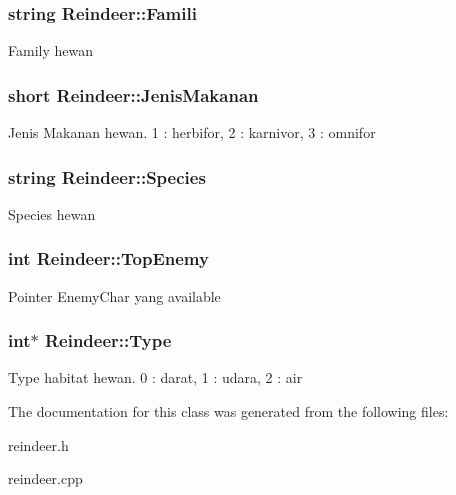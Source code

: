 \subsubsection[{\texorpdfstring{Famili}{Famili}}]{\setlength{\rightskip}{0pt plus 5cm}string Reindeer\+::\+Famili\hspace{0.3cm}{\ttfamily [protected]}}\hypertarget{class_reindeer_a76954572639868570bb712fa5e9f2416}{}\label{class_reindeer_a76954572639868570bb712fa5e9f2416}
Family hewan 
\subsubsection[{\texorpdfstring{Jenis\+Makanan}{JenisMakanan}}]{\setlength{\rightskip}{0pt plus 5cm}short Reindeer\+::\+Jenis\+Makanan\hspace{0.3cm}{\ttfamily [protected]}}\hypertarget{class_reindeer_a22bd8b287b1371169d059c37c4508572}{}\label{class_reindeer_a22bd8b287b1371169d059c37c4508572}
Jenis Makanan hewan. 1 \+: herbifor, 2 \+: karnivor, 3 \+: omnifor 
\subsubsection[{\texorpdfstring{Species}{Species}}]{\setlength{\rightskip}{0pt plus 5cm}string Reindeer\+::\+Species\hspace{0.3cm}{\ttfamily [protected]}}\hypertarget{class_reindeer_a01c318a23a5f18c9a9a854e8f4c5530a}{}\label{class_reindeer_a01c318a23a5f18c9a9a854e8f4c5530a}
Species hewan 
\subsubsection[{\texorpdfstring{Top\+Enemy}{TopEnemy}}]{\setlength{\rightskip}{0pt plus 5cm}int Reindeer\+::\+Top\+Enemy\hspace{0.3cm}{\ttfamily [protected]}}\hypertarget{class_reindeer_a5a17ac5ba35fd3f580dfb5a1cac219f5}{}\label{class_reindeer_a5a17ac5ba35fd3f580dfb5a1cac219f5}
Pointer Enemy\+Char yang available 
\subsubsection[{\texorpdfstring{Type}{Type}}]{\setlength{\rightskip}{0pt plus 5cm}int$\ast$ Reindeer\+::\+Type\hspace{0.3cm}{\ttfamily [protected]}}\hypertarget{class_reindeer_a58390c66250434a8294b9eac8c204f70}{}\label{class_reindeer_a58390c66250434a8294b9eac8c204f70}
Type habitat hewan. 0 \+: darat, 1 \+: udara, 2 \+: air 

The documentation for this class was generated from the following files\+:\begin{DoxyCompactItemize}
\item 
reindeer.\+h\item 
reindeer.\+cpp\end{DoxyCompactItemize}
